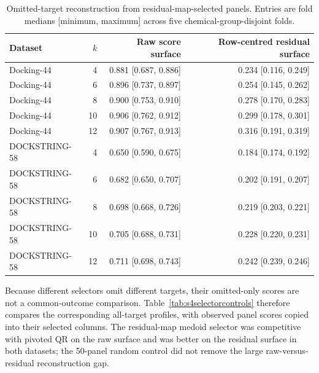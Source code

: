 \documentclass[11pt]{article}
\begin{document}
\begin{table}[htbp]
\centering
\caption{Omitted-target reconstruction from residual-map-selected panels.
Entries are fold medians [minimum, maximum] across five chemical-group-disjoint
folds.}
\label{tab:s4reconstruction}
\small
\begin{tabular}{lrrr}
\toprule
Dataset & $k$ & Raw score surface & Row-centred residual surface \\
\midrule
Docking-44 & 4  & 0.881 [0.687, 0.886] & 0.234 [0.116, 0.249] \\
Docking-44 & 6  & 0.896 [0.737, 0.897] & 0.254 [0.145, 0.262] \\
Docking-44 & 8  & 0.900 [0.753, 0.910] & 0.278 [0.170, 0.283] \\
Docking-44 & 10 & 0.906 [0.762, 0.912] & 0.299 [0.178, 0.301] \\
Docking-44 & 12 & 0.907 [0.767, 0.913] & 0.316 [0.191, 0.319] \\
DOCKSTRING-58 & 4  & 0.650 [0.590, 0.675] & 0.184 [0.174, 0.192] \\
DOCKSTRING-58 & 6  & 0.682 [0.650, 0.707] & 0.202 [0.191, 0.207] \\
DOCKSTRING-58 & 8  & 0.698 [0.668, 0.726] & 0.219 [0.203, 0.221] \\
DOCKSTRING-58 & 10 & 0.705 [0.688, 0.731] & 0.228 [0.220, 0.231] \\
DOCKSTRING-58 & 12 & 0.711 [0.698, 0.743] & 0.242 [0.239, 0.246] \\
\bottomrule
\end{tabular}
\end{table}

Because different selectors omit different targets, their omitted-only scores
are not a common-outcome comparison. Table~\ref{tab:s4selectorcontrols}
therefore compares the corresponding all-target profiles, with observed panel
scores copied into their selected columns. The residual-map medoid selector was
competitive with pivoted QR on the raw surface and was better on the residual
surface in both datasets; the 50-panel random control did not remove the large
raw-versus-residual reconstruction gap.
\end{document}

